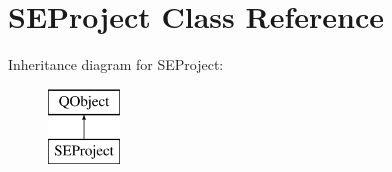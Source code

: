 \hypertarget{class_s_e_project}{\section{S\+E\+Project Class Reference}
\label{class_s_e_project}
}
Inheritance diagram for S\+E\+Project\+:\begin{figure}[H]
\begin{center}
\leavevmode
\includegraphics[height=2.000000cm]{class_s_e_project}
\end{center}
\end{figure}
